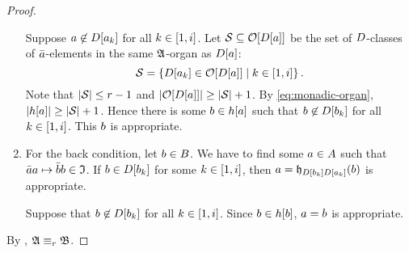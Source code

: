 \begin{proof}
\begin{enumerate}
  Suppose $a \not\in D[a_{k}]$ for all $k \in [1,i]$.
  Let $\mathcal{S} \subseteq \mathcal{O}[D[a]]$ be the set of $D$-classes of
  $\bar{a}$-elements in the same $\mathfrak{A}$-organ as $D[a]$:
  \[
    \mathcal{S} = \left\{D[a_{k}] \in \mathcal{O}[D[a]]\mathrel{}\middle|\mathrel{}k \in [1,i]\right\}.
  \]
  Note that $\left|\mathcal{S}\right| \leq r-1$ and
  $\left|\mathcal{O}[D[a]]\right| \geq \left|\mathcal{S}\right| + 1$.
  By \cref{eq:monadic-organ}, $\left|h[a]\right| \geq \left|\mathcal{S}\right| + 1$.
  Hence there is some $b \in h[a]$ such that $b \not\in
  D[b_{k}]$ for all $k \in [1,i]$. This $b$ is appropriate.
  \item For the back condition, let $b \in B$.
  We have to find some $a \in A$ such that
  $\bar{a}a \mapsto \bar{b}b \in \mathfrak{I}$.
  If $b \in D[b_{k}]$ for some $k \in [1,i]$,
  then $a = \mathfrak{h}_{D[b_{k}]D[a_{k}]}(b)$ is appropriate.
  
  Suppose that $b \not\in D[b_{k}]$ for all $k \in [1,i]$.
  Since $b \in h[b]$, $a = b$ is appropriate.
\end{enumerate}
By , $\mathfrak{A} \equiv_{r} \mathfrak{B}$.
\end{proof}